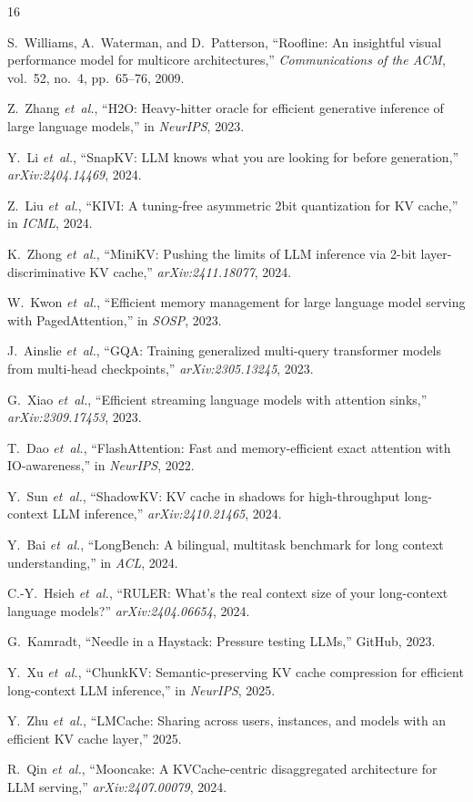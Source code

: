 \documentclass[conference]{IEEEtran}
\begin{document}


\begin{thebibliography}{16}

S.~Williams, A.~Waterman, and D.~Patterson, ``Roofline: An insightful visual performance model for multicore architectures,'' \textit{Communications of the ACM}, vol.~52, no.~4, pp.~65--76, 2009.

Z.~Zhang \textit{et~al.}, ``H2O: Heavy-hitter oracle for efficient generative inference of large language models,'' in \textit{NeurIPS}, 2023.

Y.~Li \textit{et~al.}, ``SnapKV: LLM knows what you are looking for before generation,'' \textit{arXiv:2404.14469}, 2024.

Z.~Liu \textit{et~al.}, ``KIVI: A tuning-free asymmetric 2bit quantization for KV cache,'' in \textit{ICML}, 2024.

K.~Zhong \textit{et~al.}, ``MiniKV: Pushing the limits of LLM inference via 2-bit layer-discriminative KV cache,'' \textit{arXiv:2411.18077}, 2024.

W.~Kwon \textit{et~al.}, ``Efficient memory management for large language model serving with PagedAttention,'' in \textit{SOSP}, 2023.

J.~Ainslie \textit{et~al.}, ``GQA: Training generalized multi-query transformer models from multi-head checkpoints,'' \textit{arXiv:2305.13245}, 2023.

G.~Xiao \textit{et~al.}, ``Efficient streaming language models with attention sinks,'' \textit{arXiv:2309.17453}, 2023.

T.~Dao \textit{et~al.}, ``FlashAttention: Fast and memory-efficient exact attention with IO-awareness,'' in \textit{NeurIPS}, 2022.

Y.~Sun \textit{et~al.}, ``ShadowKV: KV cache in shadows for high-throughput long-context LLM inference,'' \textit{arXiv:2410.21465}, 2024.

Y.~Bai \textit{et~al.}, ``LongBench: A bilingual, multitask benchmark for long context understanding,'' in \textit{ACL}, 2024.

C.-Y.~Hsieh \textit{et~al.}, ``RULER: What's the real context size of your long-context language models?'' \textit{arXiv:2404.06654}, 2024.

G.~Kamradt, ``Needle in a Haystack: Pressure testing LLMs,'' GitHub, 2023.

Y.~Xu \textit{et~al.}, ``ChunkKV: Semantic-preserving KV cache compression for efficient long-context LLM inference,'' in \textit{NeurIPS}, 2025.

Y.~Zhu \textit{et~al.}, ``LMCache: Sharing across users, instances, and models with an efficient KV cache layer,'' 2025.

R.~Qin \textit{et~al.}, ``Mooncake: A KVCache-centric disaggregated architecture for LLM serving,'' \textit{arXiv:2407.00079}, 2024.

\end{thebibliography}
\end{document}
